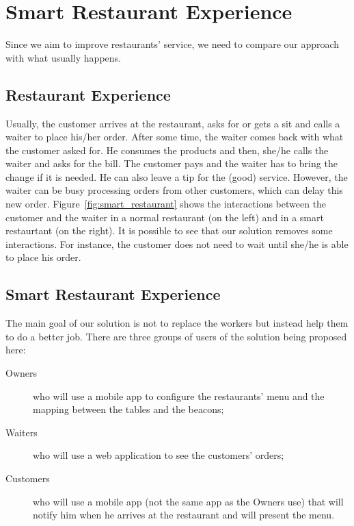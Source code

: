 
\section{Smart Restaurant Experience}
\label{sec:smart_restaurant_experience}

Since we aim to improve restaurants' service, we need to compare our approach
with what usually happens.
\subsection{Restaurant Experience}
\label{sub:restaurant_experience}
Usually, the customer arrives at the restaurant, asks for or
gets a sit and calls a waiter
to place his/her order. After some time, the waiter comes back with what
the customer asked for. He consumes the products and then, she/he calls the
waiter and asks for the bill. The customer pays and the waiter has to bring
the change if it is needed. He can also leave a tip for the (good) service.
However, the waiter can be busy processing orders
from other customers, which can delay this new order.
Figure~\ref{fig:smart_restaurant} shows the interactions between the
customer and the waiter in a normal restaurant (on the left) and in
a smart restaurtant (on the right). It is possible to see that our
solution removes some interactions. For instance, the customer does not
need to wait until she/he is able to place his order.

\subsection{Smart Restaurant Experience}
\label{sub:smart_restaurant_experience}

The main goal of our solution is not to replace the workers
but instead help them to do a
better job.
There are three groups of users of the solution being proposed here:

\begin{description}
  \item[Owners] who will use a mobile app to configure the
  restaurants' menu and the mapping between the tables and the beacons;
  \item[Waiters] who will use a web application to see the customers'
  orders;
  \item[Customers] who will use a mobile app (not the same app as the
  Owners use) that will notify him when he arrives at the restaurant and
  will present the menu.
\end{description}


